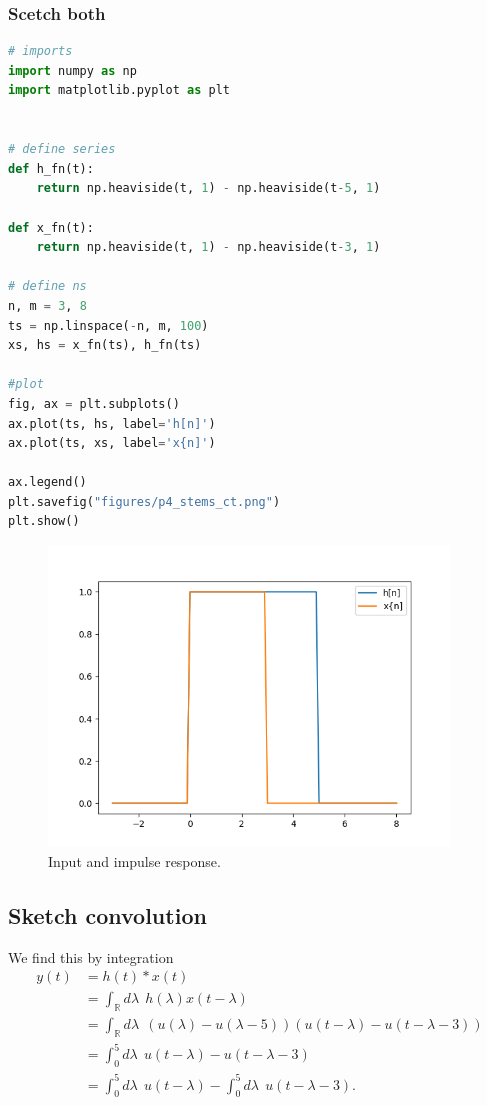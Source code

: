 \subsubsection*{Scetch both}
\begin{lstlisting}[language=python]
# imports
import numpy as np
import matplotlib.pyplot as plt


# define series
def h_fn(t):
    return np.heaviside(t, 1) - np.heaviside(t-5, 1)

def x_fn(t):
    return np.heaviside(t, 1) - np.heaviside(t-3, 1)

# define ns
n, m = 3, 8
ts = np.linspace(-n, m, 100)
xs, hs = x_fn(ts), h_fn(ts)

#plot 
fig, ax = plt.subplots()
ax.plot(ts, hs, label='h[n]')
ax.plot(ts, xs, label='x{n]')

ax.legend()
plt.savefig("figures/p4_stems_ct.png")
plt.show()
\end{lstlisting}
\clearpage

\begin{figure}[h!]
    \begin{center}
        \includegraphics[width=0.95\textwidth]{figures/p4_stems_ct.png}
    \end{center}
    \caption{Input and impulse response.}
\end{figure}

\subsection*{Sketch convolution}
We find this by integration
\begin{align}
    y(t)    &= h(t)*x(t)\\ 
            &= \int_\mathbb{R}d\lambda \ \ h(\lambda)x(t-\lambda)\\
            &= \int_\mathbb{R}d\lambda \ \ (u(\lambda) - u(\lambda-5))
                (u(t-\lambda) - u(t-\lambda-3))\\
            &= \int_0^5d\lambda \ \ u(t-\lambda) - u(t-\lambda-3)\\ 
            &= \int_0^5 d\lambda \ \ u(t-\lambda) 
                - \int_0^5 d\lambda \ \ u(t - \lambda - 3).
\end{align}

